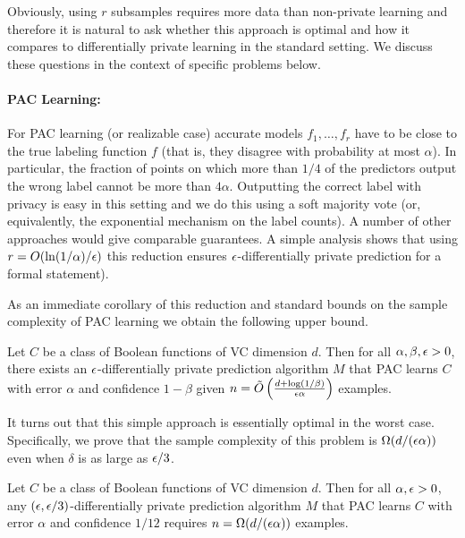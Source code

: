 \documentclass[final,12pt]{colt2018}
\begin{document}
Obviously, using $r$ subsamples requires more data than non-private learning and therefore it is natural to ask whether this approach is optimal and how it compares to differentially private learning in the standard setting. We discuss these questions in the context of specific problems below.

\paragraph{PAC Learning:}
For PAC learning (or realizable case) accurate models $f_1,\ldots,f_r$ have to be close to the true labeling function $f$ (that is, they disagree with probability at most $\alpha$).
In particular, the fraction of points on which more than $1/4$ of the predictors output the wrong label cannot be more than $4\alpha$. Outputting the correct label with privacy is easy in this setting and we do this using a soft majority vote (or, equivalently, the exponential mechanism \citep{McSherryTalwar:07} on the label counts). A number of other approaches would give comparable guarantees. A simple analysis shows that using $r = O(\ln(1/\alpha)/\epsilon)$ this reduction ensures $\epsilon$-differentially private prediction for a formal statement).

As an immediate corollary of this reduction and standard bounds on the sample complexity of PAC learning we obtain the following upper bound.%
\begin{cor}
\label{cor:pac}
Let $C$ be a class of Boolean functions of VC dimension $d$. Then for all $\alpha,\beta,\epsilon > 0$, there exists an $\epsilon$-differentially private prediction algorithm $M$ that PAC learns $C$ with error $\alpha$ and confidence $1-\beta$ given $n = \tilde O\left(\frac{d + \log(1/\beta)}{\epsilon\alpha}\right)$ examples.
\end{cor}

It turns out that this simple approach is essentially optimal in the worst case. Specifically, we prove that the sample complexity of this problem is $\Omega(d/(\epsilon\alpha))$ even when $\delta$ is as large as $\epsilon/3$.
\begin{thm}
\label{thm:pac-lower-bound}
Let $C$ be a class of Boolean functions of VC dimension $d$. Then for all $\alpha,\epsilon > 0$, any $(\epsilon,\epsilon/3)$-differentially private prediction algorithm $M$ that PAC learns $C$ with error $\alpha$ and confidence $1/12$ requires $n=\Omega(d/(\epsilon\alpha))$ examples.
\end{thm}
\end{document}

